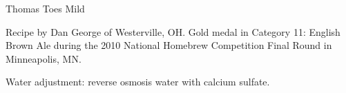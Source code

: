 \begin{recipe}{Thomas Toes Mild} %

\begin{aboutblock}
Recipe by Dan George of Westerville, OH. Gold medal in Category 11: English Brown
Ale during the 2010 National Homebrew Competition Final Round in Minneapolis, MN.
\sourceaha
\end{aboutblock}


\begin{methodandtiming}

\begin{mashsteps}
\end{mashsteps}

\begin{fermentationsteps}
\end{fermentationsteps}

\begin{directions}
Water adjustment: reverse osmosis water with  calcium sulfate.
\end{directions}

\end{methodandtiming}

\recipebreak

\begin{ingredientsblock}

\begin{malts}
\end{malts}

\begin{hops}
\end{hops}


\end{ingredientsblock}

\end{recipe}
